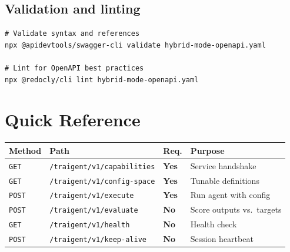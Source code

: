 \documentclass[11pt,a4paper]{article}
\newcommand{\required}{\textbf{Yes}}
\newcommand{\optional}{\textbf{No}}
\begin{document}
\subsection{Validation and linting}

\begin{lstlisting}[basicstyle=\ttfamily\footnotesize]
# Validate syntax and references
npx @apidevtools/swagger-cli validate hybrid-mode-openapi.yaml

# Lint for OpenAPI best practices
npx @redocly/cli lint hybrid-mode-openapi.yaml
\end{lstlisting}

\section{Quick Reference}

\begin{center}\small
\begin{tabularx}{\textwidth}{@{}lllX@{}}
\toprule
\textbf{Method} & \textbf{Path} & \textbf{Req.} & \textbf{Purpose} \\
\midrule
\texttt{GET}  & \texttt{/traigent/v1/capabilities} & \required & Service handshake \\
\texttt{GET}  & \texttt{/traigent/v1/config-space}  & \required & Tunable definitions \\
\texttt{POST} & \texttt{/traigent/v1/execute}       & \required & Run agent with config \\
\texttt{POST} & \texttt{/traigent/v1/evaluate}      & \optional & Score outputs vs.\ targets \\
\texttt{GET}  & \texttt{/traigent/v1/health}        & \optional & Health check \\
\texttt{POST} & \texttt{/traigent/v1/keep-alive}    & \optional & Session heartbeat \\
\bottomrule
\end{tabularx}
\end{center}
\end{document}
